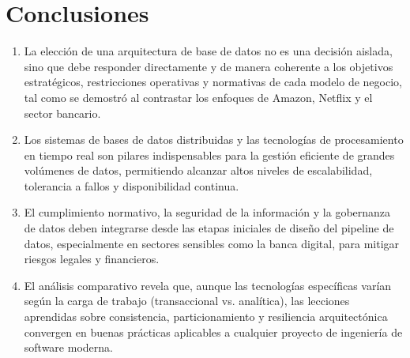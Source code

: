 \documentclass[12pt,a4paper]{article}
\begin{document}
\section{Conclusiones}
\begin{enumerate}[label=\arabic*.]
  \item La elección de una arquitectura de base de datos no es una decisión aislada, sino que debe responder directamente y de manera coherente a los objetivos estratégicos, restricciones operativas y normativas de cada modelo de negocio, tal como se demostró al contrastar los enfoques de Amazon, Netflix y el sector bancario.
  \item Los sistemas de bases de datos distribuidas y las tecnologías de procesamiento en tiempo real son pilares indispensables para la gestión eficiente de grandes volúmenes de datos, permitiendo alcanzar altos niveles de escalabilidad, tolerancia a fallos y disponibilidad continua.
  \item El cumplimiento normativo, la seguridad de la información y la gobernanza de datos deben integrarse desde las etapas iniciales de diseño del pipeline de datos, especialmente en sectores sensibles como la banca digital, para mitigar riesgos legales y financieros.
  \item El análisis comparativo revela que, aunque las tecnologías específicas varían según la carga de trabajo (transaccional vs. analítica), las lecciones aprendidas sobre consistencia, particionamiento y resiliencia arquitectónica convergen en buenas prácticas aplicables a cualquier proyecto de ingeniería de software moderna.
\end{enumerate}

\end{document}
